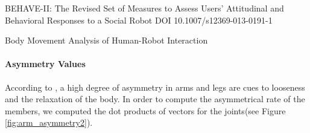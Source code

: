 BEHAVE-II: The Revised Set of Measures to Assess Users’
Attitudinal and Behavioral Responses to a Social Robot
DOI 10.1007/s12369-013-0191-1

Body Movement Analysis of Human-Robot Interaction


\paragraph{Asymmetry Values}
According to \cite{Mehrabian}, a high degree of asymmetry in arms and legs are cues to looseness and the relaxation of the body.
In order to compute the asymmetrical rate of the members, we computed the dot products of vectors for the joints(see Figure \ref{fig:arm_asymmetry2}).

